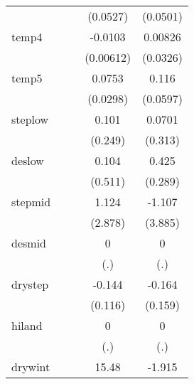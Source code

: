 {\begin{tabular}{l*{4}{c}}
            &                     &                     &    (0.0527)         &    (0.0501)         \\
[1em]
temp4       &                     &                     &     -0.0103         &     0.00826         \\
            &                     &                     &   (0.00612)         &    (0.0326)         \\
[1em]
temp5       &                     &                     &      0.0753\sym{*}  &       0.116         \\
            &                     &                     &    (0.0298)         &    (0.0597)         \\
[1em]
steplow     &                     &                     &       0.101         &      0.0701         \\
            &                     &                     &     (0.249)         &     (0.313)         \\
[1em]
deslow      &                     &                     &       0.104         &       0.425         \\
            &                     &                     &     (0.511)         &     (0.289)         \\
[1em]
stepmid     &                     &                     &       1.124         &      -1.107         \\
            &                     &                     &     (2.878)         &     (3.885)         \\
[1em]
desmid      &                     &                     &           0         &           0         \\
            &                     &                     &         (.)         &         (.)         \\
[1em]
drystep     &                     &                     &      -0.144         &      -0.164         \\
            &                     &                     &     (0.116)         &     (0.159)         \\
[1em]
hiland      &                     &                     &           0         &           0         \\
            &                     &                     &         (.)         &         (.)         \\
[1em]
drywint     &                     &                     &       15.48         &      -1.915         \\

\end{tabular}}
